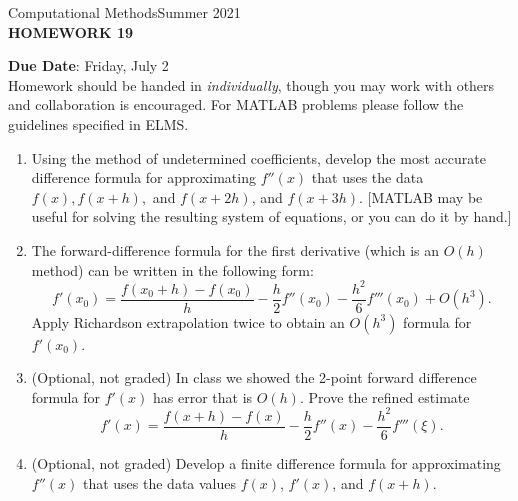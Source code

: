 \documentclass[12pt]{article}
\begin{document}
\begin{center}
Computational Methods\qquad Summer 2021
\\

\textbf{\large HOMEWORK 19}\\
\end{center}
\noindent \textbf{Due Date}: Friday, July 2\\

\noindent Homework should be handed in \emph{individually}, though you may work with others and collaboration is encouraged. For MATLAB problems please follow the guidelines specified in ELMS.

\begin{enumerate}
\item Using the method of undetermined coefficients, develop the most accurate difference formula for approximating $f''(x)$ that uses the data $f(x), f(x+h),$ and $f(x+2h)$, and $f(x+3h)$. [MATLAB may be useful for solving the resulting system of equations, or you can do it by hand.]
\item The forward-difference formula for the first derivative (which is an $O(h)$ method) can be written in the following form:
\[f'(x_0) = \frac{f(x_0+h)-f(x_0)}{h}-\frac{h}{2}f''(x_0)-\frac{h^2}{6}f'''(x_0) + O(h^3).\]
Apply Richardson extrapolation twice to obtain an $O(h^3)$ formula for $f'(x_0)$.
\item (Optional, not graded) In class we showed the 2-point forward difference formula for $f'(x)$ has error that is $O(h)$. Prove the refined estimate
	\[f'(x) = \frac{f(x+h)-f(x)}{h}-\frac{h}{2}f''(x)-\frac{h^2}{6}f'''(\xi).\]
\item (Optional, not graded) Develop a finite difference formula for approximating $f''(x)$ that uses the data values $f(x)$, $f'(x)$, and $f(x+h)$.
\end{enumerate}
\end{document}
